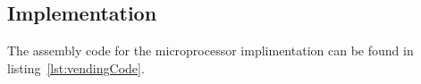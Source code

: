 \subsection{Implementation}
The assembly code for the microprocessor implimentation can be found in
listing~\ref{lst:vendingCode}.

